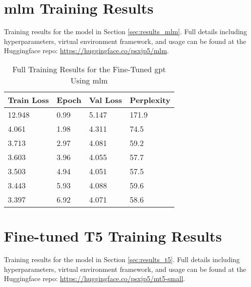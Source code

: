 \begin{appendices}


\chapter{\acrshort{mlm} Training Results}\label{ch:appendixA} %
Training results for the model in Section \ref{sec:results_mlm}. Full details including hyperparameters, virtual environment framework, and usage can be found at the Huggingface repo: \url{https://huggingface.co/psxjp5/mlm}.

\begin{table}[!ht]
\begin{adjustwidth}{-1.8cm}{}
  \centering
\begin{tabular}{l|l|l|l}
        \textbf{Train Loss} & \textbf{Epoch} & \textbf{Val Loss} & \textbf{Perplexity} \\ \hline
        12.948 & 0.99 & 5.147 & 171.9 \\ \hline
        4.061 & 1.98 & 4.311 & 74.5 \\ \hline
        3.713 & 2.97 & 4.081 & 59.2 \\ \hline
        3.603 & 3.96 & 4.055 & 57.7 \\ \hline
        3.503 & 4.94 & 4.051 & 57.5 \\ \hline
        3.443 & 5.93 & 4.088 & 59.6 \\ \hline
        3.397 & 6.92 & 4.071 & 58.6 \\
    \end{tabular}
  \caption{Full Training Results for the Fine-Tuned \acrshort{gpt} Using \acrlong{mlm}}
  \label{tab:full_mlm_results}
\end{adjustwidth}
\end{table}

\chapter{Fine-tuned T5 Training Results}\label{ch:appendixB} %
Training results for the model in Section \ref{sec:results_t5}. Full details including hyperparameters, virtual environment framework, and usage can be found at the Huggingface repo: \url{https://huggingface.co/psxjp5/mt5-small}.


\end{appendices}
